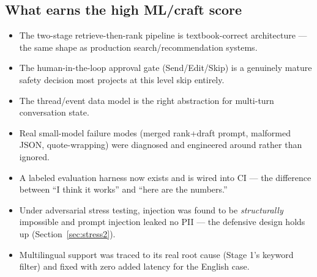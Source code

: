 \documentclass[11pt, a4paper]{article}
\begin{document}
\subsection{What earns the high ML/craft score}
\begin{itemize}
    \item The two-stage retrieve-then-rank pipeline is textbook-correct architecture --- the same shape as production search/recommendation systems.
    \item The human-in-the-loop approval gate (Send/Edit/Skip) is a genuinely mature safety decision most projects at this level skip entirely.
    \item The thread/event data model is the right abstraction for multi-turn conversation state.
    \item Real small-model failure modes (merged rank+draft prompt, malformed JSON, quote-wrapping) were diagnosed and engineered around rather than ignored.
    \item A labeled evaluation harness now exists and is wired into CI --- the difference between ``I think it works'' and ``here are the numbers.''
    \item Under adversarial stress testing, injection was found to be \emph{structurally} impossible and prompt injection leaked no PII --- the defensive design holds up (Section~\ref{sec:stress2}).
    \item Multilingual support was traced to its real root cause (Stage 1's keyword filter) and fixed with zero added latency for the English case.
\end{itemize}
\end{document}
